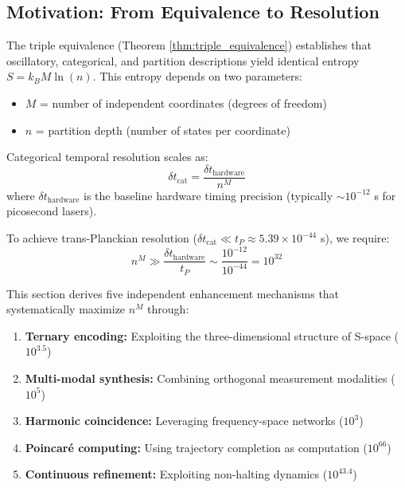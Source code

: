 \documentclass[twocolumn,10pt]{article}
\theoremstyle{remark}
\begin{document}
\subsection{Motivation: From Equivalence to Resolution}

The triple equivalence (Theorem \ref{thm:triple_equivalence}) establishes that oscillatory, categorical, and partition descriptions yield identical entropy $S = k_B M \ln(n)$. This entropy depends on two parameters:
\begin{itemize}
    \item $M$ = number of independent coordinates (degrees of freedom)
    \item $n$ = partition depth (number of states per coordinate)
\end{itemize}

Categorical temporal resolution scales as:
\begin{equation}
    \delta t_{\text{cat}} = \frac{\delta t_{\text{hardware}}}{n^M}
    \label{eq:categorical_resolution}
\end{equation}
where $\delta t_{\text{hardware}}$ is the baseline hardware timing precision (typically $\sim 10^{-12}$ s for picosecond lasers).

To achieve trans-Planckian resolution ($\delta t_{\text{cat}} \ll t_P \approx 5.39 \times 10^{-44}$ s), we require:
\begin{equation}
    n^M \gg \frac{\delta t_{\text{hardware}}}{t_P} \sim \frac{10^{-12}}{10^{-44}} = 10^{32}
    \label{eq:resolution_requirement}
\end{equation}

This section derives five independent enhancement mechanisms that systematically maximize $n^M$ through:
\begin{enumerate}
    \item \textbf{Ternary encoding:} Exploiting the three-dimensional structure of S-space ($10^{3.5}$)
    \item \textbf{Multi-modal synthesis:} Combining orthogonal measurement modalities ($10^{5}$)
    \item \textbf{Harmonic coincidence:} Leveraging frequency-space networks ($10^{3}$)
    \item \textbf{Poincaré computing:} Using trajectory completion as computation ($10^{66}$)
    \item \textbf{Continuous refinement:} Exploiting non-halting dynamics ($10^{43.4}$)
\end{enumerate}
\end{document}
